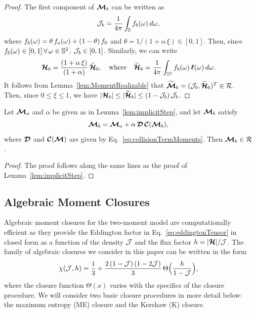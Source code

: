 \begin{proof}
  The first component of $\boldsymbol{\mathcal{M}}_{b}$ can be written as
  \begin{equation}
    \mathcal{J}_{b}=\frac{1}{4\pi}\int_{\mathbb{S}}f_{b}(\omega)\,d\omega,
  \end{equation}
  where $f_{b}(\omega)=\theta\,f_{a}(\omega)+(1-\theta)\,f_{0}$ and $\theta=1/(1+\alpha\,\xi)\in[0,1]$.  
  Then, since $f_{b}(\omega)\in[0,1]\,\forall\,\omega\in\mathbb{S}^{2}$, $\mathcal{J}_{b}\in[0,1]$.  
  Similarly, we can write
  \begin{equation*}
    \boldsymbol{\mathcal{H}}_{b}=\frac{(1+\alpha\,\xi)}{(1+\alpha)}\,\widetilde{\boldsymbol{\mathcal{H}}}_{b},
    \quad\text{where}\quad
    \widetilde{\boldsymbol{\mathcal{H}}}_{b}=\frac{1}{4\pi}\int_{\mathbb{S}^{2}}f_{b}(\omega)\,\boldsymbol{\ell}(\omega)\,d\omega.  
  \end{equation*}
  It follows from Lemma~\ref{lem:MomentRealizable} that $\widetilde{\boldsymbol{\boldsymbol{\mathcal{M}}}}_{b}=(\mathcal{J}_{b},\widetilde{\boldsymbol{\mathcal{H}}}_{b})^{T}\in\mathcal{R}$.  
  Then, since $0\le\xi\le1$, we have $|\boldsymbol{\mathcal{H}}_{b}|\le|\widetilde{\boldsymbol{\mathcal{H}}}_{b}|\le(1-\mathcal{J}_{b})\,\mathcal{J}_{b}$.  
\end{proof}

\begin{lemma}
  Let $\boldsymbol{\mathcal{M}}_{a}$ and $\alpha$ be given as in Lemma~\ref{lem:implicitStep}, and let $\boldsymbol{\mathcal{M}}_{b}$ satisfy
  \begin{equation*}
    \boldsymbol{\mathcal{M}}_{b}=\boldsymbol{\mathcal{M}}_{a}+\alpha\,\boldsymbol{\mathcal{D}}\,\boldsymbol{\mathcal{C}}(\boldsymbol{\mathcal{M}}_{b}),    
  \end{equation*}
  where $\boldsymbol{\mathcal{D}}$ and $\boldsymbol{\mathcal{C}}(\boldsymbol{\mathcal{M}})$ are given by Eq.~\eqref{eq:collisionTermMoments}.  
  Then $\boldsymbol{\mathcal{M}}_{b}\in\mathcal{R}$.  
  \label{lem:correctionStep}
\end{lemma}

\begin{proof}
  The proof follows along the same lines as the proof of Lemma~\ref{lem:implicitStep}.  
\end{proof}


\subsection{Algebraic Moment Closures}

Algebraic moment closures for the two-moment model are computationally efficient as they provide the Eddington factor in Eq.~\eqref{eq:eddingtonTensor} in closed form as a function of the density $\mathcal{J}$ and the flux factor $h=|\boldsymbol{\mathcal{H}}|/\mathcal{J}$.  
The family of algebraic closures we consider in this paper can be written in the form \cite{cernohorskyBludman_1994}
\begin{equation}
  \chi(\mathcal{J},h)=\frac{1}{3}+\frac{2\,(1-\mathcal{J})\,(1-2\mathcal{J})}{3}\,\Theta\Big(\frac{h}{1-\mathcal{J}}\Big),
\end{equation}
where the closure function $\Theta(x)$ varies with the specifics of the closure procedure.  
We will consider two basic closure procedures in more detail below: the maximum entropy (ME) closure and the Kershaw (K) closure.  

